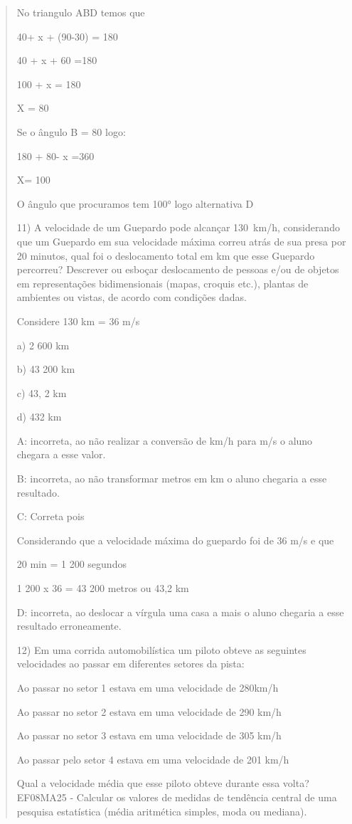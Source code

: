 \begin{quote}
\begin{escolha}
No triangulo ABD temos que

40+ x + (90-30) = 180

40 + x + 60 =180

100 + x = 180

X = 80

Se o ângulo B = 80 logo:

180 + 80- x =360

X= 100

O ângulo que procuramos tem 100° logo alternativa D

11) A velocidade de um Guepardo pode alcançar 130~km/h, considerando que
um Guepardo em sua velocidade máxima correu atrás de sua presa por 20
minutos, qual foi o deslocamento total em km que esse Guepardo
percorreu? Descrever ou esboçar deslocamento de pessoas e/ou de objetos
em representações bidimensionais (mapas, croquis etc.), plantas de
ambientes ou vistas, de acordo com condições dadas.

Considere 130 km = 36 m/s

a) 2 600 km

b) 43 200 km

c) 43, 2 km

d) 432 km

A: incorreta, ao não realizar a conversão de km/h para m/s o aluno
chegara a esse valor.

B: incorreta, ao não transformar metros em km o aluno chegaria a esse
resultado.

C: Correta pois

Considerando que a velocidade máxima do guepardo foi de 36 m/s e que

20 min = 1 200 segundos

1 200 x 36 = 43 200 metros ou 43,2 km

D: incorreta, ao deslocar a vírgula uma casa a mais o aluno chegaria a
esse resultado erroneamente.

12) Em uma corrida automobilística um piloto obteve as seguintes
velocidades ao passar em diferentes setores da pista:

Ao passar no setor 1 estava em uma velocidade de 280km/h

Ao passar no setor 2 estava em uma velocidade de 290 km/h

Ao passar no setor 3 estava em uma velocidade de 305 km/h

Ao passar pelo setor 4 estava em uma velocidade de 201 km/h

Qual a velocidade média que esse piloto obteve durante essa volta?
EF08MA25 - Calcular os valores de medidas de tendência central de uma
pesquisa estatística (média aritmética simples, moda ou mediana).


\end{escolha}
\end{quote}
